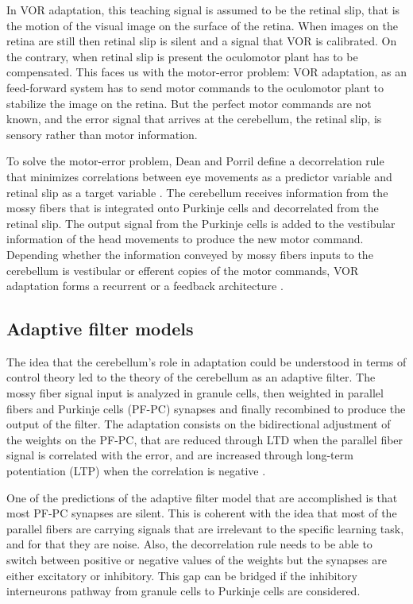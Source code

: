 \documentclass[12pt, a4paper,twoside]{tesi_upf}
\begin{document}
In VOR adaptation, this teaching signal is assumed to be the retinal slip, that is the motion of the visual image on the surface of the retina. When images on the retina are still then retinal slip is silent and a signal that VOR is calibrated. On the contrary, when retinal slip is present the oculomotor plant has to be compensated. This faces us with the motor-error problem: VOR adaptation, as an feed-forward system has to send motor commands to the oculomotor plant to stabilize the image on the retina. But the perfect motor commands are not known, and the error signal that arrives at the cerebellum, the retinal slip, is sensory rather than motor information.

To solve the motor-error problem, Dean and Porril define a decorrelation rule that minimizes correlations between eye movements as a predictor variable and retinal slip as a target variable \cite{Dean2002}. The cerebellum receives information from the mossy fibers that is integrated onto Purkinje cells and decorrelated from the retinal slip. The output signal from the Purkinje cells is added to the vestibular information of the head movements to produce the new motor command. Depending whether the information conveyed by mossy fibers inputs to the cerebellum is vestibular or efferent copies of the motor commands, VOR adaptation forms a recurrent or a feedback architecture \cite{Porrill2004}.

\subsection{Adaptive filter models}

The idea that the cerebellum's role in adaptation could be understood in terms of control theory led to the theory of the cerebellum as an adaptive filter. The mossy fiber signal input is analyzed in granule cells, then weighted in parallel fibers and Purkinje cells (PF-PC) synapses and finally recombined to produce the output of the filter. The adaptation consists on the bidirectional adjustment of the weights on the PF-PC, that are reduced through LTD when the parallel fiber signal is correlated with the error, and are increased through long-term potentiation (LTP) when the correlation is negative \cite{Dean2010}.

One of the predictions of the adaptive filter model that are accomplished is that most PF-PC synapses are silent. This is coherent with the idea that most of the parallel fibers are carrying signals that are irrelevant to the specific learning task, and for that they are noise. Also, the decorrelation rule needs to be able to switch between positive or negative values of the weights but the synapses are either excitatory or inhibitory. This gap can be bridged if the inhibitory interneurons pathway from granule cells to Purkinje cells are considered.
\end{document}
